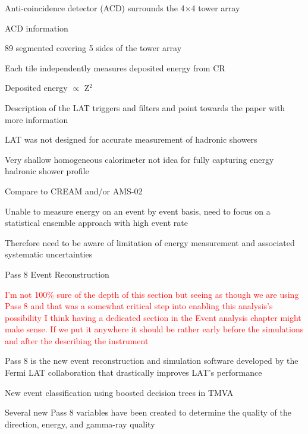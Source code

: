 \documentclass{article}
\begin{document}
\begin{myEnumerate}
\begin{myEnumerate}
				\item Anti-coincidence detector (ACD) surrounds the 4$\times$4 tower array
				\item ACD information
				\begin{myEnumerate}
					\item 89 segmented covering 5 sides of the tower array
					\item Each tile independently measures deposited energy from CR
					\item Deposited energy $\propto$ Z$^2$ 
				\end{myEnumerate}
				\item Description of the LAT triggers and filters and point towards the paper with more information
				\item LAT was not designed for accurate measurement of hadronic showers
				\begin{myEnumerate}
					\item Very shallow homogeneous calorimeter not idea for fully capturing energy hadronic shower profile
					\item Compare to CREAM and/or AMS-02 
					\item Unable to measure energy on an event by event basis, need to focus on a statistical ensemble approach with high event rate
					\item Therefore need to be aware of limitation of energy measurement and associated systematic uncertainties
				\end{myEnumerate}
			\end{myEnumerate}
		\item Pass 8 Event Reconstruction 
			\begin{myEnumerate}
				\item \textcolor{red}{I'm not 100\% sure of the depth of this section but seeing as though we are using Pass 8 and that was a somewhat critical step into enabling this analysis's possibility I think having a dedicated section in the Event analysis chapter might make sense.  If we put it anywhere it should be rather early before the simulations and after the describing the instrument}
				\item Pass 8 is the new event reconstruction and simulation software developed by the Fermi LAT collaboration that drastically improves LAT's performance
				\item New event classification using boosted decision trees in TMVA
				\begin{myEnumerate}
					\item Several new Pass 8 variables have been created to determine the quality of the direction, energy, and gamma-ray quality

\end{myEnumerate}
\end{myEnumerate}
\end{myEnumerate}
\end{document}
